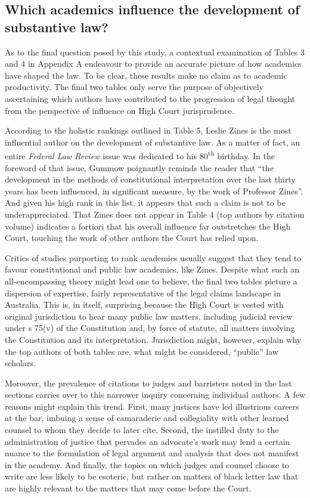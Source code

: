 \subsection{Which academics influence the development of substantive law?}

As to the final question posed by this study, a contextual examination of Tables 3 and 4 in Appendix A endeavour to provide an accurate picture of how academics have shaped the law. To be clear, these results make no claim as to academic productivity. The final two tables only serve the purpose of objectively ascertaining which authors have contributed to the progression of legal thought from the perspective of influence on High Court jurisprudence.

According to the holistic rankings outlined in Table 5, Leslie Zines is the most influential author on the development of substantive law. As a matter of fact, an entire \textit{Federal Law Review} issue was dedicated to his 80\textsuperscript{th} birthday. In the foreword of that issue, Gummow poignantly reminds the reader that ``the development in the methods of constitutional interpretation over the last thirty years has been influenced, in significant measure, by the work of Professor Zines''. And given his high rank in this list, it appears that such a claim is not to be underappreciated. That Zines does not appear in Table 4 (top authors by citation volume) indicates a fortiori that his overall influence far outstretches the High Court, touching the work of other authors the Court has relied upon.

Critics of studies purporting to rank academics usually suggest that they tend to favour constitutional and public law academics, like Zines. Despite what such an all-encompassing theory might lead one to believe, the final two tables picture a dispersion of expertise, fairly representative of the legal claims landscape in Australia. This is, in itself, surprising because the High Court is vested with original jurisdiction to hear many public law matters, including judicial review under s 75(v) of the Constitution and, by force of statute, all matters involving the Constitution and its interpretation. Jurisdiction might, however, explain why the top authors of both tables are, what might be considered, ``public'' law scholars.

Moreover, the prevalence of citations to judges and barristers noted in the last sections carries over to this narrower inquiry concerning individual authors. A few reasons might explain this trend. First, many justices have led illustrious careers at the bar, imbuing a sense of camaraderie and collegiality with other learned counsel to whom they decide to later cite. Second, the instilled duty to the administration of justice that pervades an advocate's work may lend a certain nuance to the formulation of legal argument and analysis that does not manifest in the academy. And finally, the topics on which judges and counsel choose to write are less likely to be esoteric, but rather on matters of black letter law that are highly relevant to the matters that may come before the Court.
